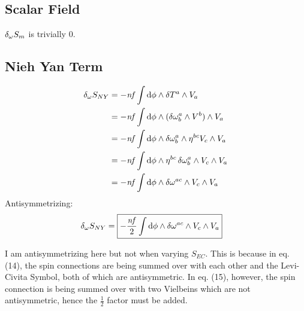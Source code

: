 \documentclass[12pt]{article}
\begin{document}
\subsection{Scalar Field}
$\var_\omega{S_m}$ is trivially $0$.

\subsection{Nieh Yan Term}
\begin{align*}
  \var_\omega{S_{NY}} &= -\mathit{nf} \int \dd{\phi} \wedge \var{T^a} \wedge V_a \\
  &= -\mathit{nf} \int \dd{\phi} \wedge (\var{\omega^a_b} \wedge V^b) \wedge V_a \\
  &= -\mathit{nf} \int \dd{\phi} \wedge \var{\omega^a_b} \wedge \eta^{bc}V_c \wedge V_a \\
  &= -\mathit{nf} \int \dd{\phi} \wedge \eta^{bc}\var{\omega^a_b} \wedge V_c \wedge V_a \\
  &= -\mathit{nf} \int \dd{\phi} \wedge \var{\omega^{ac}} \wedge V_c \wedge V_a \\
\end{align*}
Antisymmetrizing:
\begin{align}
  \var_\omega{S_{NY}} &= \boxed{-\frac{\mathit{nf}}{2} \int \dd{\phi} \wedge \var{\omega^{ac}} \wedge V_c \wedge V_a}
\end{align}

I am antisymmetrizing here but not when varying $S_{EC}$. This is because in eq. (14), the spin connections are being summed over with each other and the Levi-Civita Symbol, both of which are antisymmetric. In eq. (15), however, the spin connection is being summed over with two Vielbeins which are not antisymmetric, hence the $\frac{1}{2}$ factor must be added.
\end{document}
